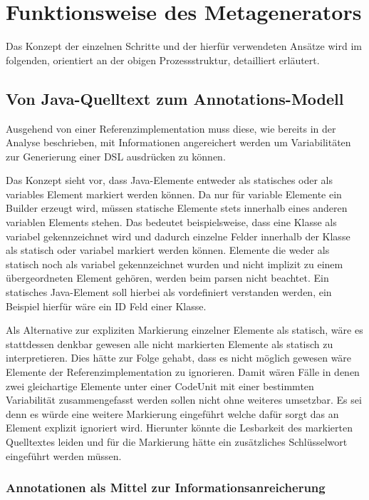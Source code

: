 \documentclass[12pt,oneside,a4paper,parskip]{scrbook}
\begin{document}
\section{Funktionsweise des Metagenerators}

Das Konzept der einzelnen Schritte und der hierfür verwendeten Ansätze wird im folgenden, orientiert an der obigen Prozessstruktur, detailliert erläutert.

\subsection{Von Java-Quelltext zum Annotations-Modell}\label{sec:sourcetomodel}

Ausgehend von einer Referenzimplementation muss diese, wie bereits in der Analyse beschrieben, mit Informationen angereichert werden um Variabilitäten zur Generierung einer DSL ausdrücken zu können.

Das Konzept sieht vor, dass Java-Elemente entweder als statisches oder als variables Element markiert werden können. Da nur für variable Elemente ein Builder erzeugt wird, müssen statische Elemente stets innerhalb eines anderen variablen Elements stehen. Das bedeutet beispielsweise, dass eine Klasse als variabel gekennzeichnet wird und dadurch einzelne Felder innerhalb der Klasse als statisch oder variabel markiert werden können. Elemente die weder als statisch noch als variabel gekennzeichnet wurden und nicht implizit zu einem übergeordneten Element gehören, werden beim parsen nicht beachtet. Ein statisches Java-Element soll hierbei als vordefiniert verstanden werden, ein Beispiel hierfür wäre ein ID Feld einer Klasse.

Als Alternative zur expliziten Markierung einzelner Elemente als statisch, wäre es stattdessen denkbar gewesen alle nicht markierten Elemente als statisch zu interpretieren. Dies hätte zur Folge gehabt, dass es nicht möglich gewesen wäre Elemente der Referenzimplementation zu ignorieren. Damit wären Fälle in denen zwei gleichartige Elemente unter einer CodeUnit mit einer bestimmten Variabilität zusammengefasst werden sollen nicht ohne weiteres umsetzbar. Es sei denn es würde eine weitere Markierung eingeführt welche dafür sorgt das an Element explizit ignoriert wird. Hierunter könnte die Lesbarkeit des markierten Quelltextes leiden und für die Markierung hätte ein zusätzliches Schlüsselwort eingeführt werden müssen.

\subsubsection{Annotationen als Mittel zur Informationsanreicherung}
\end{document}
